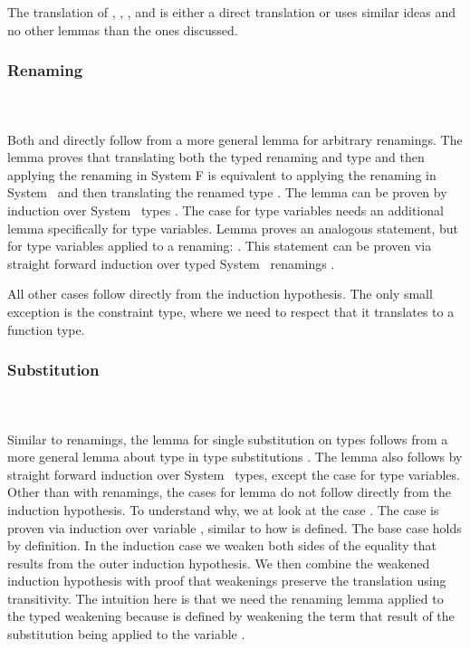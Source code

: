 \noindent The translation of , , ,  and  is either a direct translation or uses similar ideas and no other lemmas than the ones discussed.

\subsubsection{Renaming}\hfill\\\\
Both  and  directly follow from a more general lemma  for arbitrary renamings. 
The lemma  proves that translating both the typed renaming  and type  and then applying the renaming in System F is equivalent to applying the renaming  in System \Fo\ and then translating the renamed type . 
The lemma can be proven by induction over System \Fo\ types .
\DPTTypePresRen
The case for type variables needs an additional lemma  specifically for type variables.
Lemma  proves an analogous statement, but for type variables applied to a renaming: \DPTVarPresRen. 
This statement can be proven via straight forward induction over typed System \Fo\ renamings .

\noindent All other cases follow directly from the induction hypothesis. 
The only small exception is the constraint type, where we need to respect that it translates to a function type.

\subsubsection{Substitution}\hfill\\\\
Similar to renamings, the lemma for single substitution on types  follows from a more general lemma about type in type substitutions .
The lemma  also follows by straight forward induction over System \Fo\ types, except the case for type variables. 
Other than with renamings, the cases for lemma  do not follow directly from the induction hypothesis. 
To understand why, we at look at the case .
\DPTVarPresSub
The case  is proven via induction over variable , similar to how  is defined. 
The base case holds by definition. 
In the induction case we weaken both sides of the equality that results from the outer induction hypothesis. 
We then combine the weakened induction hypothesis with proof that weakenings preserve the translation using transitivity. 
The intuition here is that we need the renaming lemma  applied to the typed weakening  because  is defined by weakening the term that result of the substitution  being applied to the variable .

